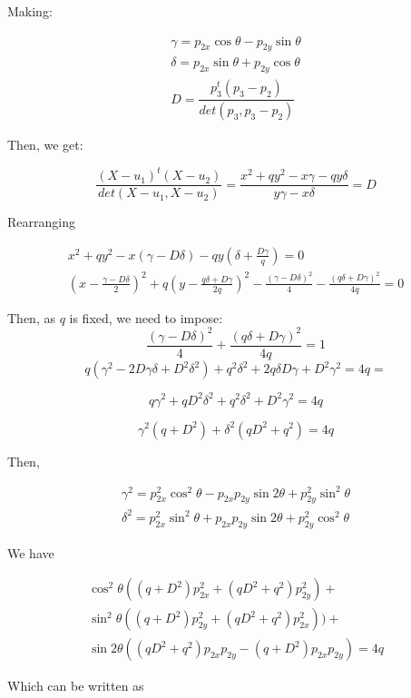 \documentclass{article}
\begin{document}
Making:

\begin{eqnarray}
\gamma = p_{2x}\cos{\theta} - p_{2y}\sin{\theta}\\
\delta = p_{2x}\sin{\theta} + p_{2y}\cos{\theta}\\
D=\dfrac{p_3^t(p_3-p_2)}{det(p_3, p_3-p_2)}
\end{eqnarray}

Then, we get:

\begin{equation}
\dfrac{(X-u_1)^t(X-u_2)}{det(X-u_1, X-u_2)} = \dfrac{x^2 + qy^2 - x\gamma -qy\delta}{y\gamma - x\delta} = D
\end{equation}

Rearranging

\begin{eqnarray*}
x^2 + qy^2 - x(\gamma -D\delta) - qy(\delta + \frac{D\gamma}{q}) = 0\\
(x - \frac{\gamma -D\delta}{2})^2 + q(y - \frac{q\delta + D\gamma}{2q})^2 - \frac{(\gamma - D\delta)^2}{4} - \frac{(q\delta + D\gamma)^2}{4q} = 0 
\end{eqnarray*}

Then, as $q$ is fixed, we need to impose:
$$ \frac{(\gamma - D\delta)^2}{4} + \frac{(q\delta + D\gamma)^2}{4q} = 1$$
$$ q(\gamma^2 - 2D\gamma\delta + D^2\delta^2) + q^2\delta^2 + 2q\delta D \gamma + D^2\gamma^2 = 4q = $$

$$
q\gamma^2 + qD^2\delta^2 + q^2\delta^2 +D^2\gamma^2 = 4q
$$

$$
\gamma^2(q +D^2) + \delta^2(qD^2 + q^2) = 4q
$$

Then,

\begin{eqnarray}
\gamma^2 = p_{2x}^2\cos^2{\theta} - p_{2x}p_{2y}\sin{2\theta} + p_{2y}^2\sin^2{\theta}\\
\delta^2 = p_{2x}^2\sin^2{\theta} + p_{2x}p_{2y}\sin{2\theta}+ p_{2y}^2\cos^2{\theta}
\end{eqnarray}

We have

\begin{eqnarray*}
\cos^2{\theta}((q+D^2)p_{2x}^2 + (qD^2+q^2)p_{2y}^2) +\\
\sin^2{\theta}((q+D^2)p_{2y}^2 + (qD^2+q^2)p_{2x}^2))+\\
\sin{2\theta}((qD^2+q^2)p_{2x}p_{2y}-(q+D^2)p_{2x}p_{2y}) = 4q
\end{eqnarray*}

Which can be written as
\end{document}
